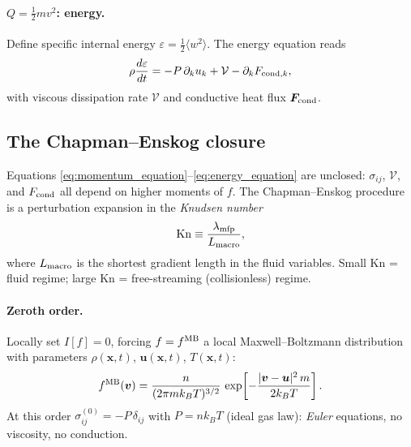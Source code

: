 \documentclass[12pt]{article}
\renewcommand{\vec}[1]{\bm{#1}}
\begin{document}
\paragraph{$Q=\tfrac{1}{2}mv^2$: energy.}  Define specific internal
energy $\varepsilon = \tfrac{1}{2}\langle w^2\rangle$.  The energy
equation reads
%
\begin{equation}
  \rho\frac{d\varepsilon}{dt}
   = -P\,\partial_k u_k + \mathcal V - \partial_k F_{{\rm cond},k},
  \label{eq:energy_equation}
\end{equation}
%
with viscous dissipation rate $\mathcal V$ and conductive heat flux
$\vec F_{\rm cond}$.

\subsection{The Chapman--Enskog closure}
\label{app:CE}

Equations \eqref{eq:momentum_equation}--\eqref{eq:energy_equation}
are unclosed: $\sigma_{ij}$, $\mathcal V$, and $F_{\rm cond}$ all
depend on higher moments of $f$.  The Chapman--Enskog procedure is a
perturbation expansion in the \emph{Knudsen number}
%
\begin{equation}
  \mathrm{Kn} \equiv \frac{\lambda_{\rm mfp}}{L_{\rm macro}},
\end{equation}
%
where $L_{\rm macro}$ is the shortest gradient length in the fluid
variables.  Small Kn = fluid regime; large Kn = free-streaming
(collisionless) regime.

\paragraph{Zeroth order.}  Locally set $I[f] = 0$, forcing $f =
f^{\rm MB}$ a local Maxwell--Boltzmann distribution with parameters
$\rho(\vec x,t)$, $\vec u(\vec x,t)$, $T(\vec x,t)$:
%
\begin{equation}
  f^{\rm MB}(\vec v)
   = \frac{n}{(2\pi m k_B T)^{3/2}}\,
     \exp\!\left[-\frac{|\vec v-\vec u|^2\,m}{2k_B T}\right].
  \label{eq:maxwellian}
\end{equation}
%
At this order $\sigma_{ij}^{(0)} = -P\,\delta_{ij}$ with
$P = n k_B T$ (ideal gas law): \emph{Euler} equations, no viscosity,
no conduction.
\end{document}
